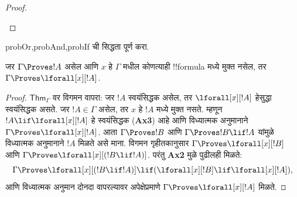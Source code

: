 \documentclass[../../../include/open-logic-section]{subfiles}
\begin{document}
\begin{proof}
\begin{enumerate}

\end{enumerate}
\end{proof}

\begin{probtag}{probOr,probAnd,probIf}
 ची सिद्धता पूर्ण करा.
\end{probtag}

\begin{thm}[व्यापकीकरण]  जर $\Gamma \Proves
!A$ असेल आणि $x$ हे $\Gamma$ मधील कोणत्याही !!{formula} मध्ये मुक्त नसेल,
तर $\Gamma \Proves \lforall[x][!A]$.
\end{thm}

\begin{proof} $\mathsf{Thm}_\Gamma$ वर विगमन वापरा: जर $!A$ स्वयंसिद्धक
असेल, तर $\lforall[x][!A]$ हेसुद्धा स्वयंसिद्धक असते. जर $!A\in \Gamma$
असेल, तर $x$ हे $!A$ मध्ये मुक्त नसते. म्हणून $!A \lif \lforall[x][!A]$
हे स्वयंसिद्धक (\textbf{Ax3}) आहे आणि विध्यात्मक अनुमानाने $\Gamma
\Proves \lforall[x][!A]$. आता $\Gamma \Proves !B$ आणि $\Gamma \Proves
!B \lif !A$ यांमुळे विध्यात्मक अनुमानाने $!A$ मिळते असे माना. विगमन
गृहीतकानुसार $\Gamma \Proves \lforall[x][!B]$ आणि $\Gamma \Proves
\lforall[x][( !B \lif !A)]$. परंतु \textbf{Ax2} मुळे पुढीलही मिळते:
\[ \Gamma \Proves
\lforall[x][( !B \lif !A)] \lif (\lforall[x][ !B] \lif \lforall[x][!A]), \]
आणि विध्यात्मक अनुमान दोनदा वापरल्यावर अपेक्षेप्रमाणे $\Gamma \Proves
\lforall[x][!A]$ मिळते. \end{proof}
\end{document}
